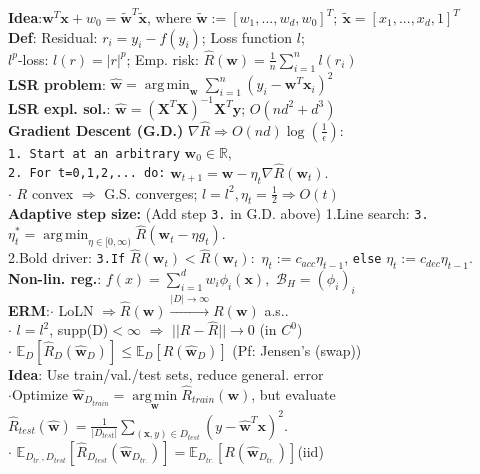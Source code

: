 \documentclass[11pt]{article}
\newcommand{\bv}[1]{\mathbf{#1}}
\newcommand{\est}[1]{\mathbf{\hat{#1}}}
\newcommand{\tv}[1]{\mathbf{\tilde{#1}}}
\newcommand{\R}{\mathbb{R}}
\newcommand{\E}{\mathbb{E}}
\DeclareMathOperator*{\argmin}{arg\,min}
\begin{document}
\begin{multicols}{4}
\textbf{Idea}:$\bv{w}^T \bv{x}+w_0 = \tv{w}^T\tv{x}$, where $\tv{w}:=[w_1,...,w_d,w_0]^T;\ \tv{x}=[x_1,...,x_d,1]^T$\\

\textbf{Def}: Residual: $r_i=y_i-f(y_i)$; Loss function $l$;\\
$l^p$-loss: $l(r)=|r|^p$; Emp. risk: $\hat{R}(\bv{w})=\frac{1}{n}\sum^n_{i=1}l(r_i)$\\

\textbf{LSR problem}: $\est{w}=\argmin_{\bv{w}}\sum^n_{i=1}(y_i-\bv{w}^T\bv{x}_i)^2$\\
\textbf{LSR expl. sol.}: $\est{w}=(\bv{X}^T \bv{X})^{-1}\bv{X}^T\bv{y}$; $O(nd^2+d^3)$\\
\textbf{Gradient Descent (G.D.)} $\nabla\hat{R}\Rightarrow O(nd)\log(\frac{1}{\epsilon})$:\\
\verb|1. Start at an arbitrary| $\bv{w}_0 \in \R,$\\
\verb|2. For t=0,1,2,... do:| $\bv{w}_{t+1}=\bv{w}-\eta_t \nabla \hat{R}(\bv{w}_t).$\\
$\cdot$ $R$ convex $\Rightarrow$ G.S. converges; $l=l^2, \eta_t=\frac{1}{2} \Rightarrow  O(t)$\\
\textbf{Adaptive step size:} (Add step \verb|3.| in G.D. above)
1.Line search: \verb|3.| $\eta^*_{t}=\argmin_{\eta\in[0,\infty)}\hat{R}(\bv{w}_t-\eta g_t)$.\\
2.Bold driver: \verb|3.If| $\hat{R}(\bv{w}_t)<\hat{R}(\bv{w}_t):$ $\eta_t:=c_{acc}\eta_{t-1}$, \verb|else| $\eta_t:=c_{dec}\eta_{t-1}.$\\
\textbf{Non-lin. reg.}: $f(x)=\sum^d_{i=1}w_i\phi_i(\bv{x}),$ $\mathcal{B}_H=(\phi_i)_i$\\
\textbf{ERM}:$\cdot$ LoLN $\Rightarrow \hat{R}(\bv{w})\xrightarrow{|D|\rightarrow\infty} R(\bv{w})$ a.s..\\
$\cdot$ $l=l^2$, supp(D)$<\infty$ $\Rightarrow$ $||R-\hat{R}||\rightarrow 0$ (in $C^0$)\\
$\cdot$ $\E_D[\hat{R}_D(\est{w}_D)]\leq\E_D[R(\est{w}_D)]$ (Pf: Jensen's (swap))\\
\textbf{Idea}: Use train/val./test sets, reduce general. error\\
$\cdot$Optimize $\est{w}_{D_{train}}=\argmin\limits_{\bv{w}}\hat{R}_{train}(\bv{w})$, but evaluate $\hat{R}_{test}(\est{w})=\frac{1}{|D_{test}|}\sum\limits_{(\bv{x},y)\in D_{test}}(y-\est{w}^T\bv{x})^2.$\\
$\cdot$ $\E_{D_{tr.},D_{test}}[\hat{R}_{D_{test}}(\est{w}_{D_{tr.}})]=\E_{D_{tr.}}[R(\est{w}_{D_{tr.}})]$(iid)\\ %

\end{multicols}
\end{document}
